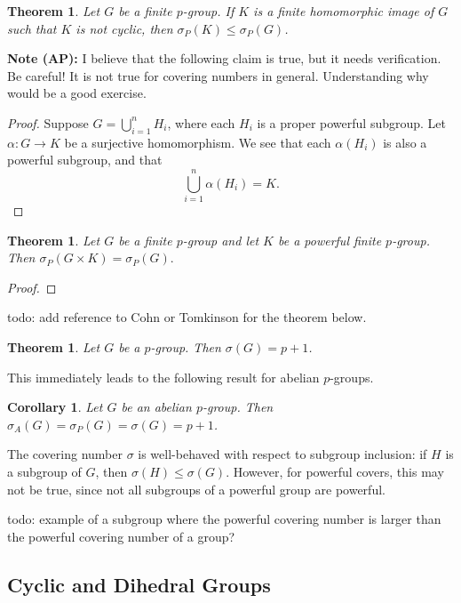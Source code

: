 \documentclass{amsart}
\numberwithin{equation} {section}
\newtheorem{theorem}[equation]{Theorem}
\newtheorem{corollary}[equation]{Corollary}
\theoremstyle{definition}
\begin{document}
\begin{theorem}
Let $G$ be a finite $p$-group. If $K$ is a finite homomorphic image of $G$ such that $K$ is not cyclic, then $\sigma_P(K) \leq \sigma_P(G)$.
\end{theorem}

\textbf{Note (AP):} I believe that the following claim is true, but it needs verification. Be careful! It is not true for covering numbers in general. Understanding why would be a good exercise. 

\begin{proof}
 Suppose $G = \bigcup_{i=1}^n H_i$, where each $H_i$ is a proper powerful subgroup. Let $\alpha: G \rightarrow K$ be a surjective homomorphism. We see that each $\alpha(H_i)$ is also a powerful subgroup, and that \[
 \bigcup_{i=1}^n \alpha\left(H_i\right) = K.
 \]
\end{proof}

\begin{theorem}
Let $G$ be a finite $p$-group and let $K$ be a powerful finite $p$-group. Then $\sigma_P(G \times K) = \sigma_P(G).$
\end{theorem}

\begin{proof}

\end{proof}

todo: add reference to Cohn or Tomkinson for the theorem below. 

\begin{theorem}\label{t:covering-number-doesnt-change-abelian} Let $G$ be a $p$-group. Then $\sigma(G) =  p + 1$.
\end{theorem}

This immediately leads to the following result for abelian $p$-groups. 

\begin{corollary}
Let $G$ be an abelian $p$-group. Then $\sigma_{A}(G) = \sigma_P(G) = \sigma(G) = p+1$.
\end{corollary}

The covering number $\sigma$ is well-behaved with respect to subgroup inclusion: if $H$ is a subgroup of $G$, then $\sigma(H) \leq \sigma(G)$. However, for powerful covers, this may not be true, since not all subgroups of a powerful group are powerful. 

todo: example of a subgroup where the powerful covering number is larger than the powerful covering number of a group? 

\subsection{Cyclic and Dihedral Groups}
\end{document}

